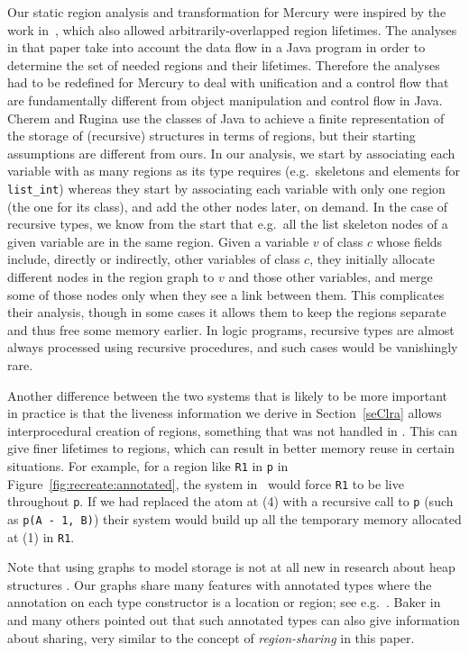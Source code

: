 \documentclass{tlp}
\newcommand{\code}[1]{{\tt#1}}
\begin{document}
Our static region analysis and transformation for Mercury
were inspired by the work in~\cite{Cherem04},
which also allowed arbitrarily-overlapped region lifetimes.
The analyses in that paper take into account
the data flow in a Java program
in order to determine the set of needed regions and their lifetimes.
Therefore the analyses had to be
redefined for Mercury to deal with unification and a control flow that are
fundamentally different from object manipulation and control flow in Java.
Cherem and Rugina use the classes of Java
to achieve a finite representation of the storage of (recursive) structures
in terms of regions,
but their starting assumptions are different from ours.
In our analysis,
we start by associating each variable with as many regions
as its type requires (e.g.\ skeletons and elements for \code{list\_int})
whereas they start by associating each variable with only one region
(the one for its class),
and add the other nodes later, on demand.
In the case of recursive types,
we know from the start that e.g.\ all the list skeleton nodes
of a given variable are in the same region.
Given a variable $v$ of class $c$ whose fields include,
directly or indirectly, other variables of class $c$,
they initially allocate different nodes in the region graph
to $v$ and those other variables,
and merge some of those nodes only when they see a link between them.
This complicates their analysis,
though in some cases it allows them to keep the regions separate
and thus free some memory earlier.
In logic programs, recursive types
are almost always processed using recursive procedures,
and such cases would be vanishingly rare.

Another difference between the two systems
that is likely to be more important in practice
is that the liveness information we derive in Section~\ref{seClra}
allows interprocedural creation of regions,
something that was not handled in \cite{Cherem04}.
This can give finer lifetimes to regions,
which can result in better memory reuse in certain situations.
For example, for a region like \code{R1} in \code{p}
in Figure~\ref{fig:recreate:annotated},
the system in~\cite{Cherem04}
would force \code{R1} to be live throughout \code{p}.
If we had replaced the atom at (4) with a recursive call to \code{p}
(such as \code{p(A - 1, B)})
their system would build up
all the temporary memory allocated at (1) in \code{R1}.

Note that using graphs to model storage is not at all new
in research about heap structures \cite{Chase90,Steensgaard96}.
Our graphs share many features with annotated types
where the annotation on each type constructor
is a location or region; see e.g.\ \cite{Baker90,TofteTalpin97}.
Baker in~\cite{Baker90} and many others pointed out that
such annotated types can also give information about sharing,
very similar to the concept of \emph{region-sharing} in this paper.
\end{document}
